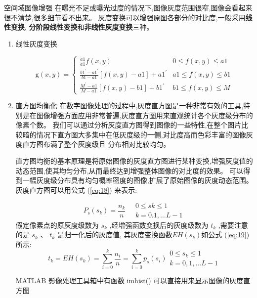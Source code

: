 \documentclass{amsart}
\begin{document}
空间域图像增强
在曝光不足或曝光过度的情况下,图像灰度范围很窄,图像会看起来很不清楚,很多细节看不出来。
灰度变换可以增强原图各部分的对比度,一般采用\textbf{线性变换},
\textbf{分阶段线性变换}和\textbf{非线性灰度变换}三种。
\begin{enumerate}
\item 线性灰度变换

  \begin{equation}
    \label{eq:17}
    \mathrm{g}(x, y)=\left\{\begin{array}{cc}
\frac{a 1}{a 1} f(x, y) & 0 \leq f(x, y) \leq a 1 \\
\frac{b 1^{\prime}-a 1^{\prime}}{b 1-a 1}[f(x, y)-a 1]+a 1^{\prime} & a 1 \leq f(x, y) \leq b 1 \\
\frac{M^{\prime}-a 1}{M-a 1}[f(x, y)-b 1]+b 1^{\prime} & b 1 \leq f(x, y) \leq M
\end{array}\right.
  \end{equation}
\item 直方图均衡化
  在数字图像处理的过程中,灰度直方图是一种非常有效的工具,特别是在图像增强方面应用非常普遍,灰度直方图用来直观统计各个灰度级分布的像素个数。
  我们可以通过分析灰度直方图得到图像的一些特性,在整个图片比较暗的情况下直方图大多集中在低灰度级的一侧,对比度高而色彩丰富的图像灰度直方图布满了整个灰度级且  分布相对比较均匀。


  直方图均衡的基本原理是将原始图像的灰度直方图进行某种变换,增强灰度值的动态范围,使其均匀分布,从而最终达到增强整体图像的对比度的效果。
  可以得到一幅灰度级分布具有均匀概率密度的图像,扩展了原始图像的灰度动态范围。灰度直方图可以用公式 (\ref{eq:18}) 来表示:

  \begin{equation}
    \label{eq:18}
    P_{\mathrm{s}}\left(s_{k}\right)=\frac{n_{k}}{n} \quad \begin{array}{c}
0 \leq s k \leq 1 \\
k=0.1, \ldots L-1
\end{array}
\end{equation}
假定像素点的原灰度级数为 $s_k$ ,经增强函数变换后的灰度级数为 $t_k$ ,需要注意的是 $s_k$ 、 $t_k$ 是归一化后的灰度值,
其灰度变换函数$ EH(s_k )$如公式 (\ref{eq:19})所示:
\begin{equation}
  \label{eq:19}
  t_{k}=E H\left(s_{k}\right)=\sum_{i=0}^{k} \frac{n_{i}}{n}=\sum_{i=0}^{k} p_{s}\left(s_{i}\right) \begin{array}{c}
0 \leq s_{k} \leq 1 \\
k=0,1, \ldots L-1
\end{array}
\end{equation}

MATLAB 影像处理工具箱中有函数 imhist() 可以直接用来显示图像的灰度直方图
\end{enumerate}
\end{document}
